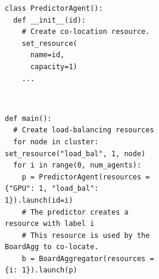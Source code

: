 \begin{figure}[t]
\begin{subfigure}[b]{0.47\linewidth}
  \centering
\begin{subfigure}[t]{.22\textwidth}
  \centering
  \begin{verbatim}
class PredictorAgent():
  def __init__(id):
    # Create co-location resource.
    set_resource(
      name=id,
      capacity=1)
    ...
  \end{verbatim}
\end{subfigure}
~
~
\begin{subfigure}[t]{0.72\textwidth}
  \centering
  \begin{verbatim}
def main():
  # Create load-balancing resources
  for node in cluster: set_resource("load_bal", 1, node)
  for i in range(0, num_agents):
    p = PredictorAgent(resources = {"GPU": 1, "load_bal": 1}).launch(id=i)
    # The predictor creates a resource with label i
    # This resource is used by the BoardAgg to co-locate.
    b = BoardAggregator(resources = {i: 1}).launch(p)
  \end{verbatim}
\end{subfigure}
  \caption{}
  \label{fig:alphazerocode}
\end{subfigure}
\begin{subfigure}[b]{0.26\textwidth}

\end{subfigure}
\end{figure}
